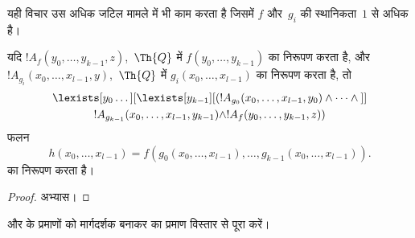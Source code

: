 \documentclass[../../../include/open-logic-section]{subfiles}
\begin{document}
यही विचार उस अधिक जटिल मामले में भी काम करता है जिसमें $f$ और~$g_i$ की
स्थानिकता~$1$ से अधिक है।

\begin{prop}
यदि $!A_f(y_0, \dots, y_{k-1}, z)$,~$\Th{Q}$ में
$f(y_0, \dots, y_{k-1})$ का निरूपण करता है, और
$!A_{g_i}(x_0, \dots, x_{l-1}, y)$,~$\Th{Q}$ में
$g_i(x_0, \dots, x_{l-1})$ का निरूपण करता है, तो
\begin{multline*}
  \lexists[y_0\dots][\lexists[y_{k-1}][(!A_{g_0}(x_0,\dots,x_{l-1},y_0) \land
      \dots \land {}]]\\
  {}!A_{g_{k-1}}(x_0,\dots,x_{l-1},y_{k-1}) \land !A_f(y_0,\dots,y_{k-1},z))
\end{multline*}
फलन
\[
h(x_0, \dots, x_{l-1}) = f(g_0(x_0, \dots, x_{l-1}), \dots, g_{k-1}(x_0,
\dots, x_{l-1})).
\]
का निरूपण करता है।
\end{prop}

\begin{proof}
अभ्यास।
\end{proof}

\begin{prob}
 और
 के प्रमाणों को मार्गदर्शक बनाकर
 का प्रमाण विस्तार से पूरा करें।
\end{prob}
\end{document}
